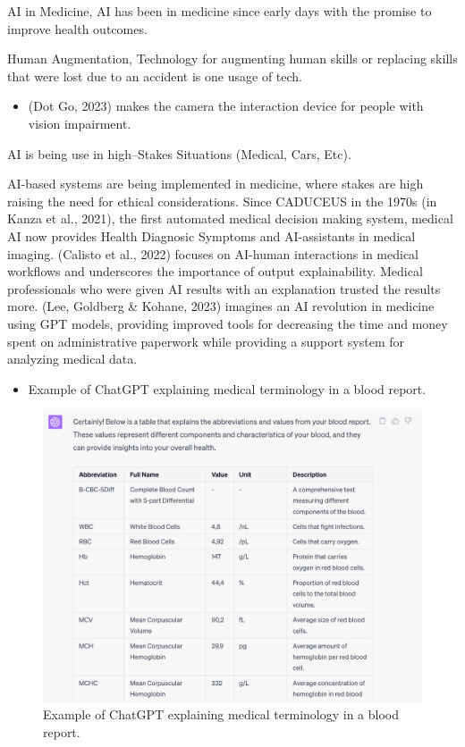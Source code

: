 \documentclass[
  letterpaper,
  DIV=11,
  numbers=noendperiod]{scrartcl}
\providecommand{\tightlist}{%
  \setlength{\itemsep}{0pt}\setlength{\parskip}{0pt}}\usepackage{longtable,booktabs,array}
\begin{document}
AI in Medicine, AI has been in medicine since early days with the
promise to improve health outcomes.

Human Augmentation, Technology for augmenting human skills or replacing
skills that were lost due to an accident is one usage of tech.

\begin{itemize}
\tightlist
\item
  (Dot Go, 2023) makes the camera the interaction device for people with
  vision impairment.
\end{itemize}

AI is being use in high--Stakes Situations (Medical, Cars, Etc).

AI-based systems are being implemented in medicine, where stakes are
high raising the need for ethical considerations. Since CADUCEUS in the
1970s (in Kanza et al., 2021), the first automated medical decision
making system, medical AI now provides Health Diagnosic Symptoms and
AI-assistants in medical imaging. (Calisto et al., 2022) focuses on
AI-human interactions in medical workflows and underscores the
importance of output explainability. Medical professionals who were
given AI results with an explanation trusted the results more. (Lee,
Goldberg \& Kohane, 2023) imagines an AI revolution in medicine using
GPT models, providing improved tools for decreasing the time and money
spent on administrative paperwork while providing a support system for
analyzing medical data.

\begin{itemize}
\tightlist
\item
  Example of ChatGPT explaining medical terminology in a blood report.
\end{itemize}

\begin{figure}[H]

{\centering \includegraphics[width=1\textwidth,height=\textheight]{./images/ai/chatgpt-medical.png}

}

\caption{Example of ChatGPT explaining medical terminology in a blood
report.}

\end{figure}%
\end{document}
